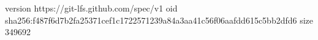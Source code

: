 version https://git-lfs.github.com/spec/v1
oid sha256:f487f6d7b2fa25371cef1c1722571239a84a3aa41c56f06aafdd615c5bb2dfd6
size 349692
